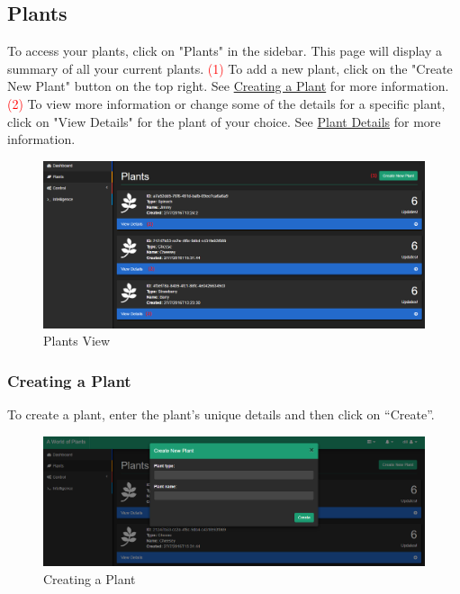 \documentclass{article}
\begin{document}
	\subsection{Plants}
	To access your plants, click on "Plants" in the sidebar. This page will display a summary of all your current plants.
	\newline
	\textcolor{red}{(1)} To add a new plant, click on the "Create New Plant" button on the top right. See \hyperref[sec:creating-a-plant]{Creating a Plant} for more information.
	\newline
	\textcolor{red}{(2)} To view more information or change some of the details for a specific plant, click on "View Details" for the plant of your choice. See \hyperref[sec:plant-details]{Plant Details} for more information.
	\begin{figure}[H]
		\includegraphics[width=\textwidth]{../images/UserManual/plants.PNG}
		\caption{Plants View}
	\end{figure}
		
		\subsubsection{Creating a Plant}
		\label{sec:creating-a-plant}
		To create a plant, enter the plant's unique details and then click on ``Create''.
		\begin{figure}[H]
			\includegraphics[width=\textwidth]{../images/UserManual/create-plant.PNG}
			\caption{Creating a Plant}
		\end{figure}
		
\end{document}
